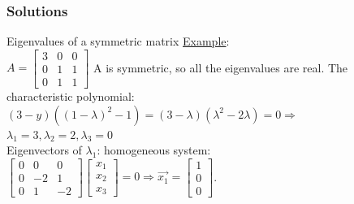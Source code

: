 \begin{frame}
	\frametitle{Solutions}
	\begin{block}{Eigenvalues of a symmetric matrix}
		\underline{Example}:\\
		$A=\begin{bmatrix}
		3 & 0 & 0\\
		0 & 1 & 1\\
		0 & 1 & 1
		\end{bmatrix}$ A is symmetric, so all the eigenvalues are real. The characteristic polynomial:\\
		$(3-y)((1-\lambda)^2-1)=(3-\lambda)(\lambda^2-2\lambda)=0 \Rightarrow$ \\ 
		$\lambda_1=3, \lambda_2=2, \lambda_3=0$\\
		Eigenvectors of $\lambda_1$: homogeneous system:\\
		$\begin{bmatrix}
		0 & 0& 0\\
		0 & -2 & 1\\
		0 & 1 & -2
		\end{bmatrix}\begin{bmatrix}
		x_1\\x_2\\x_3
		\end{bmatrix}=0 \Rightarrow \overrightarrow{x_1}=\begin{bmatrix}
		1\\0\\0
		\end{bmatrix}$.
	\end{block}
\end{frame}

